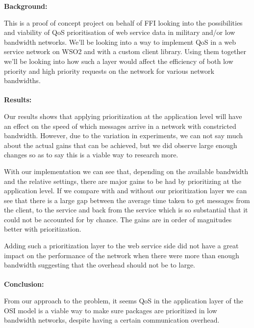 {\bf Background:}

This is a proof of concept project on behalf of FFI looking into the possibilities and viability of QoS prioritisation of web service data in military and/or low bandwidth networks.
We’ll be looking into a way to implement QoS in a web service network on WSO2 and with a custom client library.
Using them together we’ll be looking into how such a layer would affect the efficiency of both low priority and high priority requests on the network for various network bandwidths.
\\\\
{\bf Results:}

Our results shows that applying prioritization at the application level will have an effect on the speed of which messages arrive in a network with constricted bandwidth. However, due to the variation in experiments, we can not say much about the actual gains that can be achieved, but we did observe large enough changes so as to say this is a viable way to research more.

With our implementation we can see that, depending on the available bandwidth and the relative settings, there are major gains to be had by prioritizing at the application level. If we compare with and without our prioritization layer we can see that there is a large gap between the average time taken to get messages from the client, to the service and back from the service which is so substantial that it could not be accounted for by chance. The gains are in order of magnitudes better with prioritization.

Adding such a prioritization layer to the web service side did not have a great impact on the performance of the network when there were more than enough bandwidth suggesting that the overhead should not be to large.
\\\\
{\bf Conclusion:}

From our approach to the problem, it seems QoS in the application layer of the OSI model is a viable way to make sure packages are prioritized in low bandwidth networks, despite having a certain communication overhead.